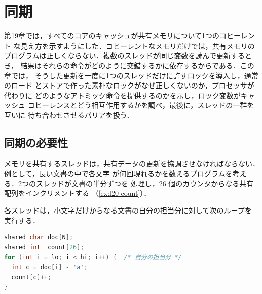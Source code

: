 \documentclass[../main.tex]{subfiles}
\begin{document}
\chapter{同期}

第19章では，すべてのコアのキャッシュが共有メモリについて1つのコヒーレント
な見え方を示すようにした．コヒーレントなメモリだけでは，共有メモリの
プログラムは正しくならない．複数のスレッドが同じ変数を読んで更新するとき，
結果はそれらの命令がどのように交錯するかに依存するからである．この章では，
そうした更新を一度に1つのスレッドだけに許すロックを導入し，通常のロード
とストアで作った素朴なロックがなぜ正しくないのか，プロセッサが代わりに
どのようなアトミック命令を提供するのかを示し，ロック変数がキャッシュ
コヒーレンスとどう相互作用するかを調べ，最後に，スレッドの一群を互いに
待ち合わせさせるバリアを扱う．

\section{同期の必要性}
\label{sec:l20-need}

メモリを共有するスレッドは，共有データの更新を協調させなければならない．
例として，長い文書の中で各文字
が何回現れるかを数えるプログラムを考える．2つのスレッドが文書の半分ずつを
処理し，26 個のカウンタからなる共有配列をインクリメントする
（\cref{ex:l20-count}）．

\begin{example}[文字を数える]
  \label{ex:l20-count}
  各スレッドは，小文字だけからなる文書の自分の担当分に対して次のループを
  実行する．
  \begin{lstlisting}[language=C, numbers=none, morekeywords={shared}]
shared char doc[N];
shared int  count[26];
for (int i = lo; i < hi; i++) {  /* 自分の担当分 */
  int c = doc[i] - 'a';
  count[c]++;
}
\end{lstlisting}
\end{example}
\end{document}
